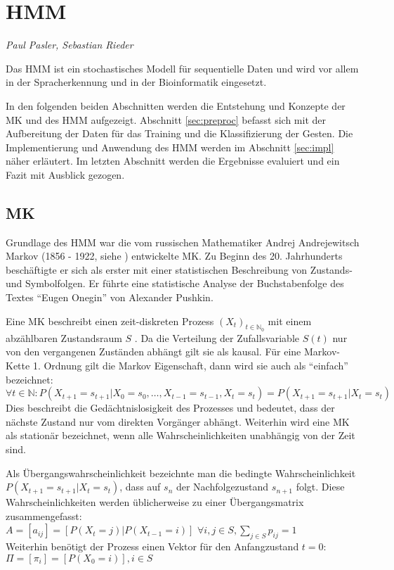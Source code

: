 ﻿\section{\acl{HMM}}
\label{mainsec:hmm}
\textit{Paul Pasler, Sebastian Rieder}

Das \acl{HMM} ist ein stochastisches Modell für sequentielle Daten und wird vor allem in der Spracherkennung und in der Bioinformatik eingesetzt.

In den folgenden beiden Abschnitten werden die Entstehung und Konzepte der \acl{MK} und des \acl{HMM} aufgezeigt.
Abschnitt \ref{sec:preproc} befasst sich mit der Aufbereitung der Daten für das Training und die Klassifizierung der Gesten.
Die Implementierung und Anwendung des \acl{HMM} werden im Abschnitt \ref{sec:impl} näher erläutert. Im letzten Abschnitt werden die Ergebnisse 
evaluiert und ein Fazit mit Ausblick gezogen.  
 
\subsection{\acl{MK}} \label{sec:chain}
Grundlage des \acl{HMM} war die vom russischen Mathematiker Andrej Andrejewitsch Markov 
(1856 - 1922, siehe \cite{markov1913}) entwickelte \acl{MK}. Zu Beginn des
20. Jahrhunderts beschäftigte er sich als erster mit einer statistischen Beschreibung von Zustands- und Symbolfolgen. 
Er führte eine statistische Analyse der Buchstabenfolge des Textes ``Eugen Onegin'' von Alexander 
Pushkin.

Eine \acl{MK} beschreibt einen zeit-diskreten Prozess \((X_t)_{t\in\mathbb{N}_0}\) mit einem abzählbaren Zustandsraum \(S\) \cite{stochMod}.
Da die Verteilung der Zufallsvariable \( S(t)\) nur von den vergangenen Zuständen abhängt gilt sie als kausal. \cite[48]{mmmFink}
Für eine Markov-Kette 1. Ordnung gilt die Markov Eigenschaft, dann wird sie auch als ``einfach'' bezeichnet: \\
\( \forall t \in \mathbb{N} : P (X_{t+1} = s_{t+1} | X_0 = s_0, \ldots , X_{t-1} = s_{t-1}, X_{t} = s_{t}) = P ( X_{t+1} = s_{t+1} | X_{t} = s_{t} ) \) \\
Dies beschreibt die Gedächtnislosigkeit des Prozesses und bedeutet, dass der nächste Zustand nur vom direkten Vorgänger abhängt.
Weiterhin wird eine \acl{MK} als stationär bezeichnet, wenn alle Wahrscheinlichkeiten unabhängig von der Zeit sind.

Als Übergangswahrscheinlichkeit bezeichnte man die bedingte Wahrscheinlichkeit \(P ( X_{t+1} = s_{t+1} | X_{t} = s_{t} ) \), dass auf 
\( s_{n}\) der Nachfolgezustand \( s_{n+1}\) folgt. Diese Wahrscheinlichkeiten werden üblicherweise zu einer Übergangsmatrix zusammengefasst: \\
\( A = [a_{ij}] = [ P (X_t = j) | P (X_{t-1} = i) ] \)
\( \forall i, j \in S, \sum_{j \in S} p_{ij} = 1 \) \\
Weiterhin benötigt der Prozess einen Vektor für den Anfangzustand \( t = 0 \):
\( \Pi = [ \pi_i] = [ P (X_0 = i) ] , i \in S \)

